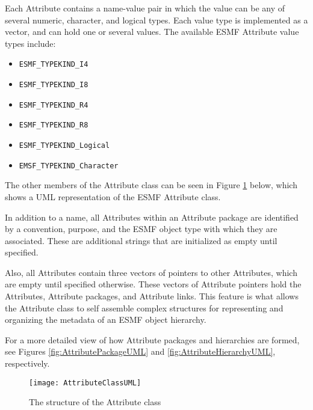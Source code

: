 %

Each Attribute contains a name-value pair in which the value can be any of several numeric, character, and logical types.  Each value type is implemented as a vector, and can hold one or several values.  The available ESMF Attribute value types include:

\label{table:attTypes}
\begin{itemize}
\item {\tt ESMF\_TYPEKIND\_I4}
\item {\tt ESMF\_TYPEKIND\_I8}
\item {\tt ESMF\_TYPEKIND\_R4}
\item {\tt ESMF\_TYPEKIND\_R8}
\item {\tt ESMF\_TYPEKIND\_Logical}
\item {\tt EMSF\_TYPEKIND\_Character}
\end{itemize}

The other members of the Attribute class can be seen in Figure \ref{fig:AttributeClassUML}  below, which shows a UML representation of the ESMF Attribute class.

In addition to a name, all Attributes within an Attribute package are identified by a convention, purpose, and the ESMF object type with which they are associated. These are additional strings that are initialized as empty until specified.

Also, all Attributes contain three vectors of pointers to other Attributes, which are empty until specified otherwise.  These vectors of Attribute pointers hold the Attributes, Attribute packages, and Attribute links.  This feature is what allows the Attribute class to self assemble complex structures for representing and organizing the metadata of an ESMF object hierarchy.

For a more detailed view of how Attribute packages and hierarchies are formed, see Figures \ref{fig:AttributePackageUML} and \ref{fig:AttributeHierarchyUML}, respectively.

\begin{figure}[h]
\centering
\texttt{[image: AttributeClassUML]}
\caption{The structure of the Attribute class}
\label{fig:AttributeClassUML}
\end{figure}
\clearpage

